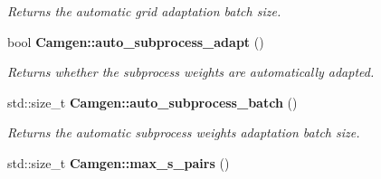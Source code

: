 \begin{DoxyCompactItemize}
\begin{DoxyCompactList}\small\item\em Returns the automatic grid adaptation batch size. \end{DoxyCompactList}\item 
\hypertarget{a00849_a9409b57f8454f3ef5a361867bb2530b3}{bool {\bfseries Camgen\-::auto\-\_\-subprocess\-\_\-adapt} ()}\label{a00849_a9409b57f8454f3ef5a361867bb2530b3}

\begin{DoxyCompactList}\small\item\em Returns whether the subprocess weights are automatically adapted. \end{DoxyCompactList}\item 
\hypertarget{a00849_abe2b1aab7d10219076e10f2dc0ea1944}{std\-::size\-\_\-t {\bfseries Camgen\-::auto\-\_\-subprocess\-\_\-batch} ()}\label{a00849_abe2b1aab7d10219076e10f2dc0ea1944}

\begin{DoxyCompactList}\small\item\em Returns the automatic subprocess weights adaptation batch size. \end{DoxyCompactList}\item 
\hypertarget{a00849_ad00578f7ebeeb3b05b7034ee71527e2a}{std\-::size\-\_\-t {\bfseries Camgen\-::max\-\_\-s\-\_\-pairs} ()}\label{a00849_ad00578f7ebeeb3b05b7034ee71527e2a}


\end{DoxyCompactItemize}
